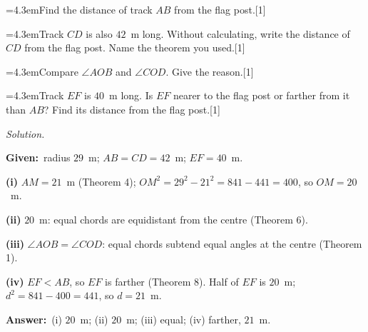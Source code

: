 \documentclass[11pt,a4paper]{article}
\newcommand{\pc}[2]{\par\smallskip\noindent\hspace*{2em}\hangindent=4.3em\hangafter=1\makebox[2em][l]{(#1)}\hspace{0.3em}#2\par}
\newenvironment{answerblock}
  {\par\needspace{6\baselineskip}\smallskip\begingroup\small\linespread{1.2}\selectfont\color{muted}\noindent\textit{Solution.}\par}
  {\par\endgroup\medskip}
\newcommand{\mks}[1]{\hfill\mbox{[#1]}}
\newcommand{\Given}{\textbf{Given:}~}
\newcommand{\Ans}{\textbf{Answer:}~}
\begin{document}
\pc{i}{Find the distance of track $AB$ from the flag post.\mks{1}}
\pc{ii}{Track $CD$ is also $42$~m long. Without calculating, write the distance of $CD$ from the flag post. Name the theorem you used.\mks{1}}
\pc{iii}{Compare $\angle AOB$ and $\angle COD$. Give the reason.\mks{1}}
\pc{iv}{Track $EF$ is $40$~m long. Is $EF$ nearer to the flag post or farther from it than $AB$? Find its distance from the flag post.\mks{1}}

\begin{answerblock}
\begin{minipage}[t]{0.66\linewidth}\vspace{0pt}
\Given radius $29$~m; $AB=CD=42$~m; $EF=40$~m.

\textbf{(i)} $AM=21$~m (Theorem 4); $OM^2=29^2-21^2=841-441=400$, so $OM=20$~m.

\textbf{(ii)} $20$~m: equal chords are equidistant from the centre (Theorem 6).

\textbf{(iii)} $\angle AOB=\angle COD$: equal chords subtend equal angles at the centre (Theorem 1).

\textbf{(iv)} $EF<AB$, so $EF$ is farther (Theorem 8). Half of $EF$ is $20$~m; $d^2=841-400=441$, so $d=21$~m.

\Ans (i) $20$~m; (ii) $20$~m; (iii) equal; (iv) farther, $21$~m.
\end{minipage}\hfill
\begin{minipage}[t]{0.3\linewidth}\vspace{0pt}
\centering
{}
\end{minipage}
\end{answerblock}
\end{document}

